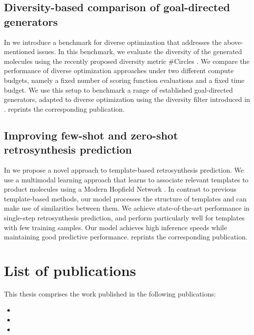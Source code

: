 \subsection{Diversity-based comparison of goal-directed generators\label{sec:divopt}} 
In \citet{renzDiverseHitsNovo2024} we introduce a benchmark for diverse optimization that addresses the
above-mentioned issues. In this benchmark, we evaluate the diversity of the generated molecules
using the recently proposed diversity metric \#Circles \citep{xieHowMuchSpace2023}. We compare the
performance of diverse optimization approaches under two different compute budgets, namely a fixed
number of scoring function evaluations and a fixed time budget. We use this setup to benchmark a
range of established goal-directed generators, adapted to diverse optimization using the diversity
filter introduced in \citet{blaschkeMemoryassistedReinforcementLearning2020}.
 reprints the corresponding publication.

\subsection{Improving few-shot and zero-shot retrosynthesis prediction}
In \citet{seidlImprovingFewZeroShot2022} we propose a novel approach to template-based
retrosynthesis prediction. We use a multimodal learning approach that learns to associate relevant
templates to product molecules using a Modern Hopfield Network
\citep{ramsauerHopfieldNetworksAll2020}. In contrast to previous template-based methods, our model
processes the structure of templates and can make use of similarities between them. We achieve
state-of-the-art performance in single-step retrosynthesis prediction, and perform particularly well
for templates with few training samples. Our model achieves high inference speeds while maintaining
good predictive performance.  reprints the corresponding publication.

\section{List of publications\label{sec:publications}} This thesis comprises the work published in
the following publications:

\begin{itemize}
	\item {}
	\item {}
	\item {}
\end{itemize}

